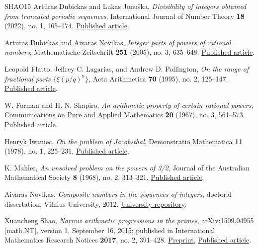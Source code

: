 \documentclass[11pt,reqno]{amsart}
\theoremstyle{definition}
\theoremstyle{remark}
\begin{document}
\begin{thebibliography}{SHAO15}
\label{ref-dj22}
Artūras Dubickas and Lukas Jonuška, \emph{Divisibility of integers
obtained from truncated periodic sequences}, International Journal of
Number Theory \textbf{18} (2022), no. 1, 165--174.
\href{https://doi.org/10.1142/S1793042122500129}{Published article}.

\label{ref-dn}
Artūras Dubickas and Aivaras Novikas, \emph{Integer parts of powers of
rational numbers}, Mathematische Zeitschrift \textbf{251} (2005), no. 3,
635--648. \href{https://doi.org/10.1007/s00209-005-0827-4}{Published article}.

\label{ref-flp}
Leopold Flatto, Jeffrey C. Lagarias, and Andrew D. Pollington,
\emph{On the range of fractional parts \(\{\xi(p/q)^n\}\)},
Acta Arithmetica \textbf{70} (1995), no. 2, 125--147.
\href{https://doi.org/10.4064/aa-70-2-125-147}{Published article}.

\label{ref-fs}
W. Forman and H. N. Shapiro, \emph{An arithmetic property of certain
rational powers}, Communications on Pure and Applied Mathematics
\textbf{20} (1967), no. 3, 561--573.
\href{https://doi.org/10.1002/cpa.3160200305}{Published article}.

\label{ref-iw78}
Henryk Iwaniec, \emph{On the problem of Jacobsthal}, Demonstratio
Mathematica \textbf{11} (1978), no. 1, 225--231.
\href{https://doi.org/10.1515/dema-1978-0121}{Published article}.

\label{ref-m68}
K. Mahler, \emph{An unsolved problem on the powers of 3/2},
Journal of the Australian Mathematical Society \textbf{8} (1968), no. 2,
313--321. \href{https://doi.org/10.1017/S1446788700005371}{Published article}.

\label{ref-n}
Aivaras Novikas, \emph{Composite numbers in the sequences of integers},
doctoral dissertation, Vilnius University, 2012.
\href{https://epublications.vu.lt/object/elaba:2089125/index.html}{University repository}.

\label{ref-shao15}
Xuancheng Shao, \emph{Narrow arithmetic progressions in the
primes}, arXiv:1509.04955 {[}math.NT{]}, version 1, September 16, 2015;
published in International Mathematics Research Notices \textbf{2017}, no. 2,
391--428. \href{https://arxiv.org/abs/1509.04955v1}{Preprint},
\href{https://doi.org/10.1093/imrn/rnv393}{Published article}.


\end{thebibliography}
\end{document}
